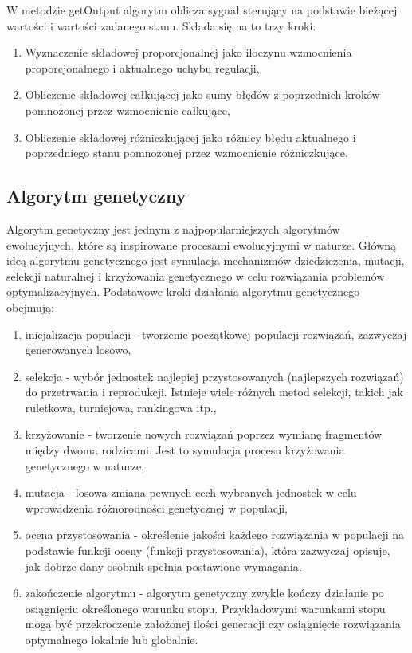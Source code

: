 \documentclass[12pt,twoside]{article}
\begin{document}
W metodzie getOutput algorytm oblicza sygnał sterujący na podstawie bieżącej wartości i wartości zadanego stanu. Składa się na to trzy kroki:

\begin{enumerate}[label=\alph*), leftmargin=1.25cm]
	\item Wyznaczenie składowej proporcjonalnej jako iloczynu wzmocnienia proporcjonalnego i aktualnego uchybu regulacji,
	
	\item Obliczenie składowej całkującej jako sumy błędów z poprzednich kroków pomnożonej przez wzmocnienie całkujące,
	
	\item Obliczenie składowej różniczkującej jako różnicy błędu aktualnego i poprzedniego stanu pomnożonej przez wzmocnienie różniczkujące. 
	
\end{enumerate}

\subsection{Algorytm genetyczny}
Algorytm genetyczny jest jednym z najpopularniejszych algorytmów ewolucyjnych, które są inspirowane procesami ewolucyjnymi w naturze. Główną ideą algorytmu genetycznego jest symulacja mechanizmów dziedziczenia, mutacji, selekcji naturalnej i krzyżowania genetycznego w celu rozwiązania problemów optymalizacyjnych.
Podstawowe kroki działania algorytmu genetycznego obejmują:
\begin{enumerate}[label=\alph*), leftmargin=1.25cm]
	\item inicjalizacja populacji - tworzenie początkowej populacji rozwiązań, zazwyczaj generowanych losowo,
	
	\item selekcja - wybór jednostek najlepiej przystosowanych (najlepszych rozwiązań) do przetrwania i reprodukcji. Istnieje wiele różnych metod selekcji, takich jak ruletkowa, turniejowa, rankingowa itp.,
	
	\item krzyżowanie - tworzenie nowych rozwiązań poprzez wymianę fragmentów między dwoma rodzicami. Jest to symulacja procesu krzyżowania genetycznego w naturze,
	
	\item mutacja - losowa zmiana pewnych cech wybranych jednostek w celu wprowadzenia różnorodności genetycznej w populacji,
	
	\item ocena przystosowania - określenie jakości każdego rozwiązania w populacji na podstawie funkcji oceny (funkcji przystosowania), która zazwyczaj opisuje, jak dobrze dany osobnik spełnia postawione wymagania,
	
	\item zakończenie algorytmu - algorytm genetyczny zwykle kończy działanie po osiągnięciu określonego warunku stopu. Przykładowymi warunkami stopu mogą być przekroczenie założonej ilości generacji czy osiągnięcie rozwiązania optymalnego lokalnie lub globalnie. \\
	
\end{enumerate}
\end{document}
